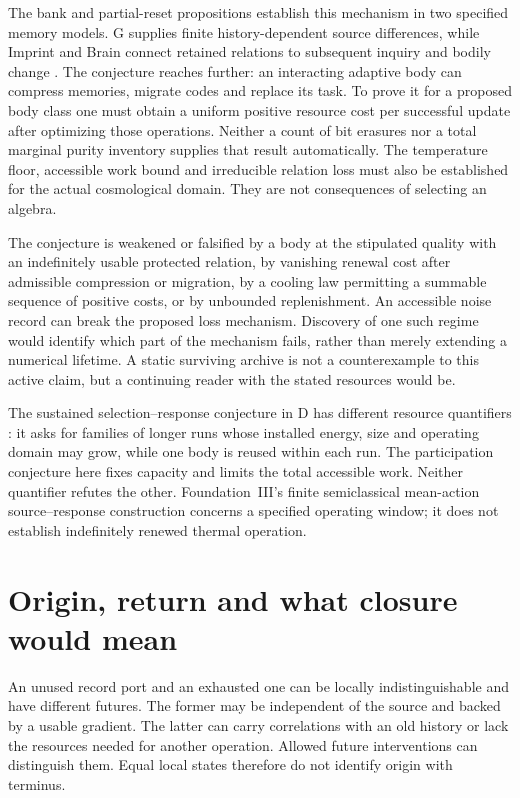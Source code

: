 \documentclass[12pt,a4paper]{article}
\begin{document}
The bank and partial-reset propositions establish this mechanism in two specified memory models. G supplies finite history-dependent source differences, while Imprint and Brain connect retained relations to subsequent inquiry and bodily change \cite{G,Imprint,Brain}. The conjecture reaches further: an interacting adaptive body can compress memories, migrate codes and replace its task. To prove it for a proposed body class one must obtain a uniform positive resource cost per successful update after optimizing those operations. Neither a count of bit erasures nor a total marginal purity inventory supplies that result automatically. The temperature floor, accessible work bound and irreducible relation loss must also be established for the actual cosmological domain. They are not consequences of selecting an algebra.

The conjecture is weakened or falsified by a body at the stipulated quality with an indefinitely usable protected relation, by vanishing renewal cost after admissible compression or migration, by a cooling law permitting a summable sequence of positive costs, or by unbounded replenishment. An accessible noise record can break the proposed loss mechanism. Discovery of one such regime would identify which part of the mechanism fails, rather than merely extending a numerical lifetime. A static surviving archive is not a counterexample to this active claim, but a continuing reader with the stated resources would be.

The sustained selection--response conjecture in D has different resource
quantifiers \cite{D}: it asks for families of longer runs whose installed
energy, size and operating domain may grow, while one body is reused
within each run. The participation conjecture here fixes capacity and
limits the total accessible work. Neither quantifier refutes the other.
Foundation~III's finite semiclassical mean-action source--response
construction \cite{FoundationIII} concerns a specified operating window;
it does not establish indefinitely renewed thermal operation.

\section{Origin, return and what closure would mean}

An unused record port and an exhausted one can be locally indistinguishable and have different futures. The former may be independent of the source and backed by a usable gradient. The latter can carry correlations with an old history or lack the resources needed for another operation. Allowed future interventions can distinguish them. Equal local states therefore do not identify origin with terminus.
\end{document}
